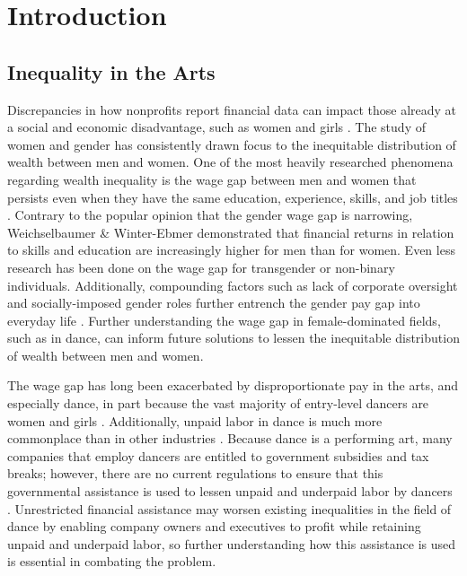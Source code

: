 \documentclass[Dance Data
Project,article,submit,moreauthors,pdftex]{mdpi}
\begin{document}
\hypertarget{introduction}{%
\section{Introduction}\label{introduction}}

\hypertarget{inequality-in-the-arts}{%
\subsection{Inequality in the Arts}\label{inequality-in-the-arts}}

Discrepancies in how nonprofits report financial data can impact those
already at a social and economic disadvantage, such as women and girls
\citep{fuchs_where_2021}. The study of women and gender has consistently
drawn focus to the inequitable distribution of wealth between men and
women. One of the most heavily researched phenomena regarding wealth
inequality is the wage gap between men and women that persists even when
they have the same education, experience, skills, and job titles
\citep{jikar_gender_2022}. Contrary to the popular opinion that the
gender wage gap is narrowing, Weichselbaumer \& Winter-Ebmer
\citep{weichselbaumer_meta-analysis_2005} demonstrated that financial
returns in relation to skills and education are increasingly higher for
men than for women. Even less research has been done on the wage gap for
transgender or non-binary individuals. Additionally, compounding factors
such as lack of corporate oversight and socially-imposed gender roles
further entrench the gender pay gap into everyday life
\citep{noauthor_handbook_2013}. Further understanding the wage gap in
female-dominated fields, such as in dance, can inform future solutions
to lessen the inequitable distribution of wealth between men and women.

The wage gap has long been exacerbated by disproportionate pay in the
arts, and especially dance, in part because the vast majority of
entry-level dancers are women and girls \citep{jikar_gender_2022}.
Additionally, unpaid labor in dance is much more commonplace than in
other industries \citep{noauthor_handbook_2013}. Because dance is a
performing art, many companies that employ dancers are entitled to
government subsidies and tax breaks; however, there are no current
regulations to ensure that this governmental assistance is used to
lessen unpaid and underpaid labor by dancers \citep{fuchs_where_2021}.
Unrestricted financial assistance may worsen existing inequalities in
the field of dance by enabling company owners and executives to profit
while retaining unpaid and underpaid labor, so further understanding how
this assistance is used is essential in combating the problem.
\end{document}
